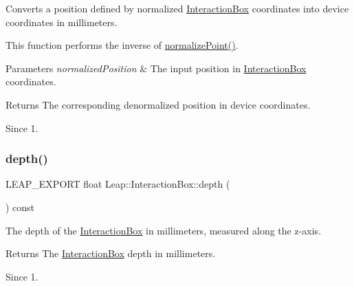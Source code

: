 Converts a position defined by normalized \hyperlink{class_leap_1_1_interaction_box}{Interaction\+Box} coordinates into device coordinates in millimeters.


\begin{DoxyCodeInclude}
\end{DoxyCodeInclude}


This function performs the inverse of \hyperlink{class_leap_1_1_interaction_box_ad0e6082a1e640216b7d705552f09b754}{normalize\+Point()}.


\begin{DoxyParams}{Parameters}
{\em normalized\+Position} & The input position in \hyperlink{class_leap_1_1_interaction_box}{Interaction\+Box} coordinates. \\
\hline
\end{DoxyParams}
\begin{DoxyReturn}{Returns}
The corresponding denormalized position in device coordinates. 
\end{DoxyReturn}
\begin{DoxySince}{Since}
1. 
\end{DoxySince}
\mbox{\label{class_leap_1_1_interaction_box_a94e804d28a471e149509aad631d473a0}} 
\subsubsection{\texorpdfstring{depth()}{depth()}}
{\footnotesize\ttfamily L\+E\+A\+P\+\_\+\+E\+X\+P\+O\+RT float Leap\+::\+Interaction\+Box\+::depth (\begin{DoxyParamCaption}{ }\end{DoxyParamCaption}) const}

The depth of the \hyperlink{class_leap_1_1_interaction_box}{Interaction\+Box} in millimeters, measured along the z-\/axis.


\begin{DoxyCodeInclude}
\end{DoxyCodeInclude}


\begin{DoxyReturn}{Returns}
The \hyperlink{class_leap_1_1_interaction_box}{Interaction\+Box} depth in millimeters. 
\end{DoxyReturn}
\begin{DoxySince}{Since}
1. 
\end{DoxySince}
\mbox{\label{class_leap_1_1_interaction_box_a75eab3cbd5e0ccdb117f2ea0ccefda32}} 
